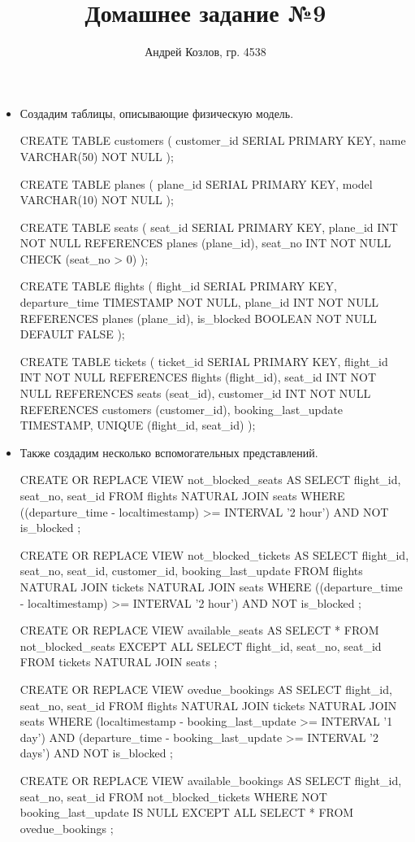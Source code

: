 \documentclass[10pt, a4paper]{article}
\title{Домашнее задание №9}
\author{Андрей Козлов, гр. 4538}
\date{}
\begin{document}
\maketitle

\begin{itemize}
	\item {Создадим таблицы, описывающие физическую модель.
	\begin{sql}
CREATE TABLE customers (
	customer_id SERIAL PRIMARY KEY,
	name VARCHAR(50) NOT NULL
);

CREATE TABLE planes (
	plane_id SERIAL PRIMARY KEY,
	model VARCHAR(10) NOT NULL
);

CREATE TABLE seats (
	seat_id SERIAL PRIMARY KEY,
	plane_id INT NOT NULL REFERENCES planes (plane_id),
	seat_no INT NOT NULL CHECK (seat_no > 0)
);

CREATE TABLE flights (
	flight_id SERIAL PRIMARY KEY,
	departure_time TIMESTAMP NOT NULL,
	plane_id INT NOT NULL REFERENCES planes (plane_id),
	is_blocked BOOLEAN NOT NULL DEFAULT FALSE
);

CREATE TABLE tickets (
	ticket_id SERIAL PRIMARY KEY,
	flight_id INT NOT NULL REFERENCES flights (flight_id),
	seat_id INT NOT NULL REFERENCES seats (seat_id),
	customer_id INT NOT NULL REFERENCES customers (customer_id),
	booking_last_update TIMESTAMP,
	UNIQUE (flight_id, seat_id)
);
	\end{sql}}

\newpage

	\item {Также создадим несколько вспомогательных представлений.
	\begin{sql}
CREATE OR REPLACE VIEW not_blocked_seats AS
	SELECT flight_id, seat_no, seat_id FROM flights
		NATURAL JOIN seats
	WHERE ((departure_time - localtimestamp) >= INTERVAL '2 hour')
	AND NOT is_blocked
;

CREATE OR REPLACE VIEW not_blocked_tickets AS
	SELECT flight_id, seat_no, seat_id, customer_id,
		booking_last_update
	FROM flights NATURAL JOIN tickets NATURAL JOIN seats
	WHERE ((departure_time - localtimestamp) >= INTERVAL '2 hour')
	AND NOT is_blocked
;

CREATE OR REPLACE VIEW available_seats AS
	SELECT * FROM not_blocked_seats
	EXCEPT ALL
	SELECT flight_id, seat_no, seat_id FROM tickets
		NATURAL JOIN seats
;

CREATE OR REPLACE VIEW ovedue_bookings AS
	SELECT flight_id, seat_no, seat_id FROM flights
		NATURAL JOIN tickets NATURAL JOIN seats
	WHERE (localtimestamp - booking_last_update >= INTERVAL '1 day')
	AND (departure_time - booking_last_update >= INTERVAL '2 days')
	AND NOT is_blocked
;

CREATE OR REPLACE VIEW available_bookings AS
	SELECT flight_id, seat_no, seat_id FROM not_blocked_tickets
		WHERE NOT booking_last_update IS NULL
	EXCEPT ALL
	SELECT * FROM ovedue_bookings
;
	\end{sql}}
\end{itemize}
\end{document}
